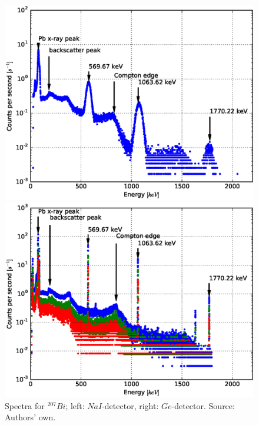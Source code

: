\documentclass[a4paper]{article}
\begin{document}
\begin{figure}[H]
	\begin{minipage}[t]{0.5\textwidth}
		\begin{center}
		\includegraphics[width=1.0\textwidth]{plots/bi207.eps}
		\end{center}
	\end{minipage}
	\begin{minipage}[t]{0.5\textwidth}
		\begin{center}
		\includegraphics[width=1.0\textwidth]{plots/bi207_ged.eps}
		\end{center}
	\end{minipage}
	\caption{Spectra for $^{207}Bi$; left: $NaI$-detector, right: $Ge$-detector. Source: Authors' own.}
	\label{fig:bi207}
\end{figure}
\end{document}
